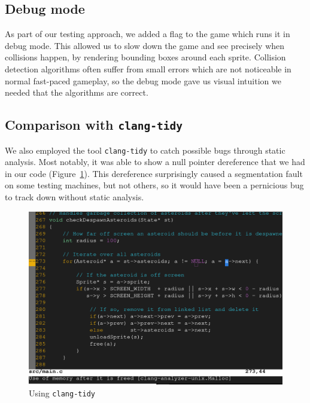 \documentclass{article}
\begin{document}
    \subsection{Debug mode}

        As part of our testing approach, we added a flag to the game which runs
        it in debug mode. This allowed us to slow down the game and see
        precisely when collisions happen, by rendering bounding boxes around
        each sprite. Collision detection algorithms often suffer from small
        errors which are not noticeable in normal fast-paced gameplay, so the
        debug mode gave us visual intuition we needed that the algorithms are
        correct.

    \subsection{Comparison with \texttt{clang-tidy}}

        We also employed the tool \texttt{clang-tidy} to catch possible bugs
        through static analysis. Most notably, it was able to show a null
        pointer dereference that we had in our code
        (Figure~\ref{fig:clang-tidy}). This dereference surprisingly caused a
        segmentation fault on some testing machines, but not others, so it
        would have been a pernicious bug to track down without static analysis.

        \begin{figure}[h!]
            \includegraphics[width=\linewidth]{clang-tidy.png}
            \caption{Using \texttt{clang-tidy}}
            \label{fig:clang-tidy}
        \end{figure}
\end{document}

